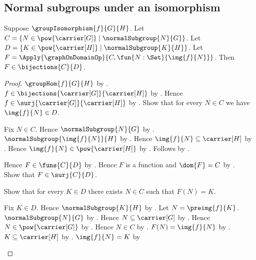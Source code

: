 \subsection{Normal subgroups under an isomorphism}

\begin{theorem}\label{group_isomorphism_normal_correspondence_bijection}
    Suppose $\groupIsomorphism{f}{G}{H}$.
    Let
        $C=\{N\in\pow{\carrier[G]}\mid
            \text{$\normalSubgroup{N}{G}$}\}$.
    Let
        $D=\{K\in\pow{\carrier[H]}\mid
            \text{$\normalSubgroup{K}{H}$}\}$.
    Let
        $F=\Apply{\graphOnDomainOp}{
            C,\fun{N:\Set}{\img{f}{N}}}$.
    Then $F\in\bijections{C}{D}$.
\end{theorem}
\begin{proof}
    $\groupHom{f}{G}{H}$ by
        .
    $f\in\bijections{\carrier[G]}{\carrier[H]}$ by
        .
    Hence $f\in\surj{\carrier[G]}{\carrier[H]}$ by
        .
    Show that for every $N\in C$ we have $\img{f}{N}\in D$.
    \begin{subproof}
        Fix $N\in C$.
        Hence $\normalSubgroup{N}{G}$ by \auto.
        $\normalSubgroup{\img{f}{N}}{H}$ by
            .
        Hence $\img{f}{N}\subseteq\carrier[H]$ by
            .
        Hence $\img{f}{N}\in\pow{\carrier[H]}$ by
            .
        Follows by \auto.
    \end{subproof}
    Hence $F\in\funs{C}{D}$ by
        .
    Hence $F$ is a function and $\dom{F}=C$ by .
    Show that $F\in\surj{C}{D}$.
    \begin{subproof}
        Show that for every $K\in D$ there exists $N\in C$ such that
            $F(N)=K$.
        \begin{subproof}
            Fix $K\in D$.
            Hence $\normalSubgroup{K}{H}$ by \auto.
            Let $N=\preimg{f}{K}$.
            $\normalSubgroup{N}{G}$ by
                .
            Hence $N\subseteq\carrier[G]$ by
                .
            Hence $N\in\pow{\carrier[G]}$ by .
            Hence $N\in C$ by \auto.
            $F(N)=\img{f}{N}$ by
                .
            $K\subseteq\carrier[H]$ by
                .
            $\img{f}{N}=K$ by

\end{subproof}
\end{subproof}
\end{proof}
